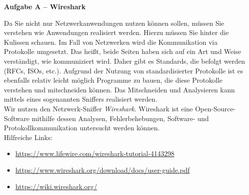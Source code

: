 \documentclass[paper=a4,fontsize=11pt]{scrartcl}%
\numberwithin{equation}{section}
\begin{document}
\begin{center}\Large{\textbf{Aufgabe A -- Wireshark}}\end{center}\vskip0.25in
Da Sie nicht nur Netzwerkanwendungen nutzen können sollen, müssen Sie verstehen wie Anwendungen realisiert werden. Hierzu müssen Sie hinter die Kulissen schauen. Im Fall von Netzwerken wird die Kommunikation via Protokolle umgesetzt. Das heißt, beide Seiten haben sich auf ein Art und Weise verständigt, wie kommuniziert wird. Daher gibt es Standards, die befolgt werden (RFCs, ISOs, etc.). Aufgrund der Nutzung von standardisierter Protokolle ist es ebenfalls relativ leicht möglich Programme zu bauen, die diese Protokolle verstehen und mitschneiden können. Das Mitschneiden und Analysieren kann mittels eines sogenannten Sniffers realisiert werden.\\
Wir nutzen den Netzwerk-Sniffer \emph{Wireshark}. Wireshark ist eine Open-Source-Software mithilfe dessen Analysen, Fehlerbehebungen, Software- und Protokollkommunikation untersucht werden können.\\
Hilfreiche Links:
\begin{itemize}
	\item \url{https://www.lifewire.com/wireshark-tutorial-4143298}
	\item \url{https://www.wireshark.org/download/docs/user-guide.pdf}
	\item \url{https://wiki.wireshark.org/}
\end{itemize}
\end{document}
